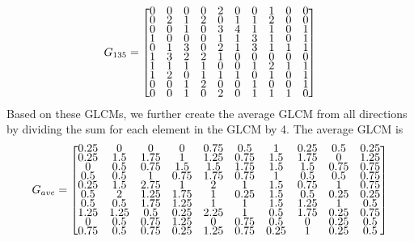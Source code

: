 \begin{align*}
G_{135} = 
\renewcommand{\arraystretch}{0.5}
\begin{bmatrix}
     0&     0&     0&     0 &    2 &    0 &    0 &    1  &   0  &   0\\
     0&     2&     1&     2 &    0 &    1 &    1 &    2  &   0  &   0\\
     0&     0&     1&     0 &    3 &    4 &    1 &    1  &   0  &   1\\
     1&     0&     0&     0 &    1 &    1 &    3 &    1  &   0  &   1\\
     0&     1&     3&     0 &    2 &    1 &    3 &    1  &   1  &   1\\
     1&     3&     2&     2 &    1 &    0 &    0 &    0  &   0  &   0\\
     1&     1&     1&     1 &    0 &    0 &    1 &    2  &   1  &   1\\
     1&     2&     0&     1 &    1 &    1 &    0 &    1  &   0  &   1\\
     0&     0&     1&     2 &    0 &    0 &    1 &    0  &   0  &   1\\
     0&     0&     1&     0 &    2 &    0 &    1 &    1  &   1  &   0
\end{bmatrix}
\end{align*}
Based on these GLCMs, we further create the average GLCM from all directions by dividing the sum for each element in the GLCM by 4. The average GLCM is 
\begin{align*}
G_{ave} = 
\renewcommand{\arraystretch}{0.5}
\begin{bmatrix}
0.25 &0 &0 &0 &0.75 &0.5 &1 &0.25 &0.5 &0.25\\
0.25 &1.5 &1.75 &1 &1.25 &0.75 &1.5 &1.75 &0 &1.25\\
0 &0.5 &0.75 &1.5 &1.5 &1.75 &1.5 &1.5 &0.75 &0.75\\
0.5 &0.5 &1 &0.75 &1.75 &0.75 &1 &0.5 &0.5 &0.75\\
0.25 &1.5 &2.75 &1 &2 &1 &1.5 &0.75 &1 &0.75\\
0.5 &2 &1.25 &1.75 &1 &0.25 &1.5 &0.5 &0.25 &0.25\\
0.5 &0.5 &1.75 &1.25 &1 &1 &1.5 &1.25 &1 &0.5\\
1.25 &1.25 &0.5 &0.25 &2.25 &1 &0.5 &1.75 &0.25 &0.75\\
0 &0.5 &0.75 &1.25 &0 &0.75 &0.5 &0 &0.25 &0.5\\
0.75 &0.5 &0.75 &0.25 &1.25 &0.75 &0.25 &1 &0.25 &0.5
\end{bmatrix}
\end{align*}
